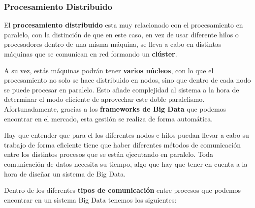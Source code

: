 \subsubsection{Procesamiento Distribuido}
El \textbf{procesamiento distribuido} esta muy relacionado con el procesamiento en paralelo, con la distinción de que en este caso, en vez de usar diferente hilos o procesadores dentro de una misma máquina, se lleva a cabo en distintas máquinas que se comunican en red formando un \textbf{clúster}.

A su vez, estás máquinas podrán tener \textbf{varios núcleos}, con lo que el procesamiento no solo se hace distribuido en nodos, sino que dentro de cada nodo se puede procesar en paralelo. Esto añade complejidad al sistema a la hora de determinar el modo eficiente de aprovechar este doble paralelismo. Afortunadamente, gracias a los \textbf{frameworks de Big Data} que podemos encontrar en el mercado, esta gestión se realiza de forma automática.

Hay que entender que para el los diferentes nodos e hilos puedan llevar a cabo su trabajo de forma eficiente tiene que haber diferentes métodos de comunicación entre los distintos procesos que se están ejecutando en paralelo. Toda comunicación de datos necesita su tiempo, algo que hay que tener en cuenta a la hora de diseñar un sistema de Big Data.

Dentro de los diferentes \textbf{tipos de comunicación} entre procesos que podemos encontrar en un sistema Big Data tenemos los siguientes:

